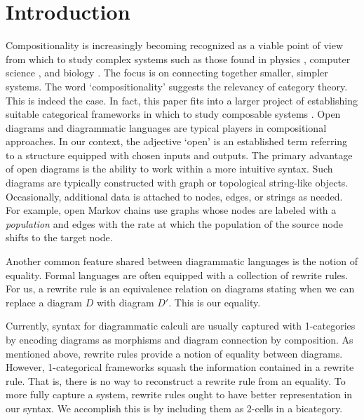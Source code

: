 %
%

\section{Introduction}
\label{sec:Introduction}

Compositionality is increasingly
becoming recognized as 
a viable point of view
from which to study 
complex systems such as 
those found in physics
	\cite{AbramCoecke_CatSemanticQuantum}, 
computer science 
	\cite{SassoneSobocinski_PetriNets}, 
and biology 
	\cite{BaezFongPollard_CompMarkovProcesses}.  
The focus is on 
connecting together smaller, 
simpler systems.  
The word `compositionality' suggests 
the relevancy of category theory.
This is indeed the case.
In fact, this paper
fits into a 
larger project of
establishing suitable categorical frameworks
in which to study composable systems
\cite{BaezCoyaFong_Props,
BaezFong_CompPassLinNets,
BaezFongPollard_CompMarkovProcesses,
BaezPollard_CompFrameRxNets,
Cicala_SpansCospans,
CicalaCourser_BicatSpansCospan,
Pollard_OpenMarkov}.
Open diagrams and diagrammatic languages
are typical players in compositional approaches. 
In our context, the adjective `open' is 
an established term
\cite{Dixon_OpenGraphs,
Merry_BangGraphs,
Pollard_OpenMarkov}
referring to a structure equipped with 
chosen inputs and outputs. 
The primary advantage of
open diagrams 
is the ability to work
within a more intuitive syntax.
Such diagrams are typically 
constructed with graph or 
topological string-like objects.  
Occasionally, additional data 
is attached to nodes, edges, or strings 
as needed. 
For example, open Markov chains
	\cite{Pollard_OpenMarkov}
use graphs whose nodes are 
labeled with a \emph{population} 
and edges with the rate at which 
the population of the source node 
shifts to the target node.  

Another common feature shared 
between diagrammatic languages is 
the notion of equality.  
Formal languages are often
equipped with a collection of rewrite rules.
For us, a rewrite rule is an equivalence relation
on diagrams stating when we can
replace a diagram $D$ with diagram $D'$.
This is our equality. 

Currently, syntax for diagrammatic calculi 
are usually captured with 1-categories
by encoding diagrams as morphisms
and diagram connection by composition. 
As mentioned above,
rewrite rules provide a notion of
equality between diagrams. 
However, 1-categorical frameworks squash 
the information contained in a rewrite rule.
That is, there is no way to reconstruct 
a rewrite rule from an equality. 
To more fully capture a system, 
rewrite rules ought to have better
representation in our syntax.
We accomplish this is by 
including them as 2-cells in a bicategory.  

